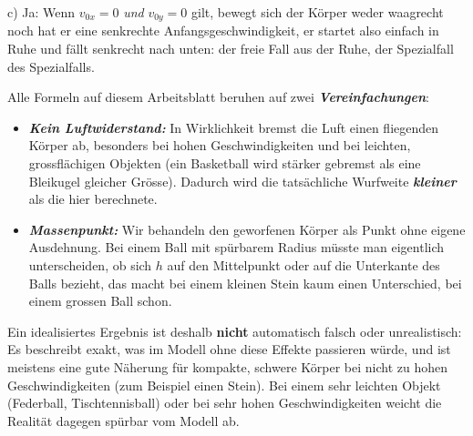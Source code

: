 \documentclass[addpoints,11pt,a4paper]{exam}
\begin{document}
\begin{questions}
\begin{groupbox}
\begin{parts}
\begin{solution}
  c) Ja: Wenn $v_{0x}=0$ \emph{und} $v_{0y}=0$ gilt, bewegt sich der
  Körper weder waagrecht noch hat er eine senkrechte Anfangsgeschwindigkeit,
  er startet also einfach in Ruhe und fällt senkrecht nach unten: der
  freie Fall aus der Ruhe, der Spezialfall des Spezialfalls.
  \end{solution}
\end{parts}
\end{groupbox}
\end{questions}

\begin{theoriebox}
Alle Formeln auf diesem Arbeitsblatt beruhen auf zwei
\textbf{\emph{Vereinfachungen}}:

\begin{itemize}[leftmargin=1.2cm,itemsep=0.2em]
  \item \textbf{\emph{Kein Luftwiderstand:}} In Wirklichkeit bremst die
  Luft einen fliegenden Körper ab, besonders bei hohen Geschwindigkeiten
  und bei leichten, grossflächigen Objekten (ein Basketball wird stärker
  gebremst als eine Bleikugel gleicher Grösse). Dadurch wird die
  tatsächliche Wurfweite \textbf{\emph{kleiner}} als die hier berechnete.
  \item \textbf{\emph{Massenpunkt:}} Wir behandeln den geworfenen Körper
  als Punkt ohne eigene Ausdehnung. Bei einem Ball mit spürbarem Radius
  müsste man eigentlich unterscheiden, ob sich $h$ auf den Mittelpunkt
  oder auf die Unterkante des Balls bezieht, das macht bei einem
  kleinen Stein kaum einen Unterschied, bei einem grossen Ball schon.
\end{itemize}

\begin{hinweisbox}
Ein idealisiertes Ergebnis ist deshalb \textbf{nicht} automatisch
\glqq falsch\grqq{} oder unrealistisch: Es beschreibt exakt, was im
Modell ohne diese Effekte passieren würde, und ist meistens eine gute
Näherung für kompakte, schwere Körper bei nicht zu hohen Geschwindigkeiten
(zum Beispiel einen Stein). Bei einem sehr leichten Objekt (Federball,
Tischtennisball) oder bei sehr hohen Geschwindigkeiten weicht die Realität
dagegen spürbar vom Modell ab.
\end{hinweisbox}
\end{theoriebox}
\end{document}
